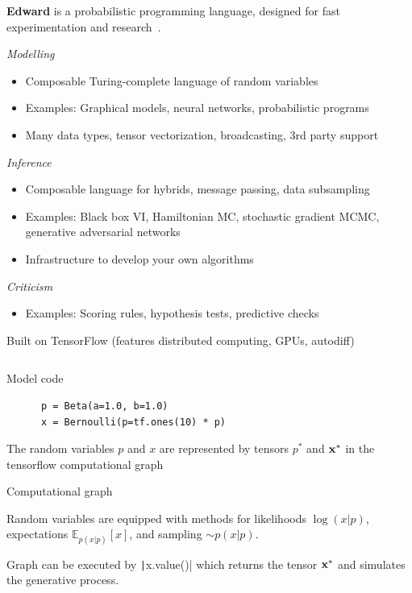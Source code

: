 \documentclass[10pt]{beamer}
\begin{document}
\begin{frame}
\vspace{3ex}
\textbf{Edward} is a probabilistic programming language,
designed for fast experimentation and research~\citep{tran_deep_2017}.

\emph{Modelling}
\begin{itemize}
\item Composable Turing-complete language of random variables
\item Examples: Graphical models, neural networks, probabilistic programs
\item Many data types, tensor vectorization, broadcasting, 3rd party support
\end{itemize}

\emph{Inference}
\begin{itemize}
\item Composable language for hybrids, message passing, data subsampling
\item Examples: Black box VI, Hamiltonian MC, stochastic gradient MCMC,
  generative adversarial networks
\item Infrastructure to develop your own algorithms
\end{itemize}

\emph{Criticism}
\begin{itemize}
\item Examples: Scoring rules, hypothesis tests, predictive checks
\end{itemize}

\vspace{1ex}
Built on TensorFlow (features distributed computing, GPUs, autodiff)
\end{frame}

\begin{frame}[fragile]
  \inputminted{python}{python/beta-bernoulli.py}
\end{frame}

\begin{frame}[fragile]
  \begin{block}{Model code}
    \begin{verbatim}
      p = Beta(a=1.0, b=1.0)
      x = Bernoulli(p=tf.ones(10) * p)
    \end{verbatim}
  \end{block}
  The random variables $p$ and $x$ are represented by tensors $p^*$ and $\boldsymbol{\mathbf{x}}^*$ in the tensorflow computational graph
  \begin{block}{Computational graph}
    \begin{center}
      
    \end{center}
  \end{block}
  Random variables are equipped with methods for likelihoods $\log(x|p)$,
  expectations $\mathbb{E}_{p(x|p)}[x]$, and sampling $\sim p(x|p)$.

  Graph can be executed by \texttt|x.value()| which returns the tensor $\boldsymbol{\mathbf{x}}^*$ and simulates the
  generative process.
\end{frame}
\end{document}
